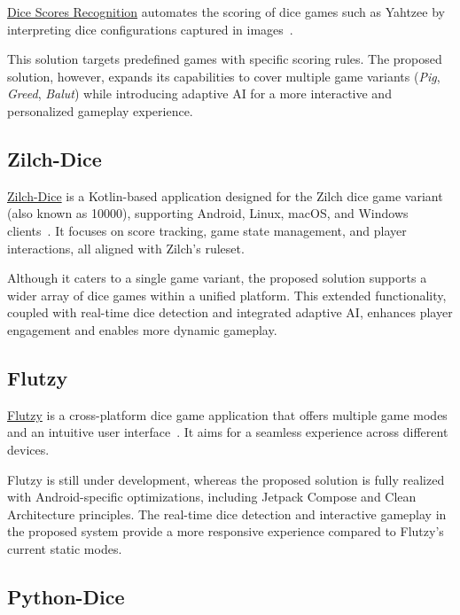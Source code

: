 \href{https://github.com/ordovas/dice-scores-recognition}{Dice Scores Recognition} automates the scoring of dice games such as Yahtzee by interpreting dice configurations captured in images~\cite{bib:Dice-Scores-Recognition}.

This solution targets predefined games with specific scoring rules. The proposed solution, however, expands its capabilities to cover multiple game variants (\emph{Pig}, \emph{Greed}, \emph{Balut}) while introducing adaptive AI for a more interactive and personalized gameplay experience.

\subsection{Zilch-Dice}

\href{https://github.com/pandulapeter/zilch-dice}{Zilch-Dice} is a Kotlin-based application designed for the Zilch dice game variant (also known as 10000), supporting Android, Linux, macOS, and Windows clients~\cite{bib:zilchdice}. It focuses on score tracking, game state management, and player interactions, all aligned with Zilch’s ruleset.

Although it caters to a single game variant, the proposed solution supports a wider array of dice games within a unified platform. This extended functionality, coupled with real-time dice detection and integrated adaptive AI, enhances player engagement and enables more dynamic gameplay.

\subsection{Flutzy}

\href{https://github.com/amuhaimin02/flutzy}{Flutzy} is a cross-platform dice game application that offers multiple game modes and an intuitive user interface~\cite{bib:flutzy}. It aims for a seamless experience across different devices.

Flutzy is still under development, whereas the proposed solution is fully realized with Android-specific optimizations, including Jetpack Compose and Clean Architecture principles. The real-time dice detection and interactive gameplay in the proposed system provide a more responsive experience compared to Flutzy’s current static modes.

\subsection{Python-Dice}

